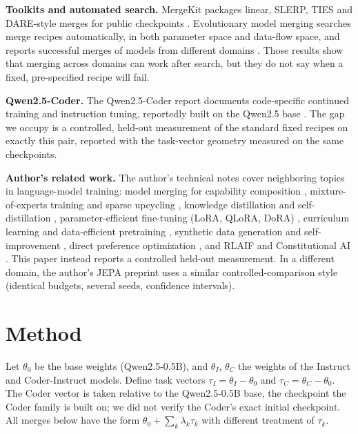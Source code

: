 \documentclass[conference]{IEEEtran}
\begin{document}
\textbf{Toolkits and automated search.} MergeKit packages linear, SLERP, TIES and DARE-style merges for public checkpoints \cite{goddard2024mergekit}. Evolutionary model merging searches merge recipes automatically, in both parameter space and data-flow space, and reports successful merges of models from different domains \cite{akiba2024evolutionary}. Those results show that merging across domains can work after search, but they do not say when a fixed, pre-specified recipe will fail.

\textbf{Qwen2.5-Coder.} The Qwen2.5-Coder report documents code-specific continued training and instruction tuning, reportedly built on the Qwen2.5 base \cite{hui2024qwen25coder}. The gap we occupy is a controlled, held-out measurement of the standard fixed recipes on exactly this pair, reported with the task-vector geometry measured on the same checkpoints.

\textbf{Author's related work.} The author's technical notes cover neighboring topics in language-model training: model merging for capability composition \cite{santos2026modelmergingfo}, mixture-of-experts training and sparse upcycling \cite{santos2026mixtureofexper}, knowledge distillation and self-distillation \cite{santos2026knowledgedisti}, parameter-efficient fine-tuning (LoRA, QLoRA, DoRA) \cite{santos2026parametereffic}, curriculum learning and data-efficient pretraining \cite{santos2026curriculumlear}, synthetic data generation and self-improvement \cite{santos2026syntheticdatag}, direct preference optimization \cite{santos2026directpreferen}, and RLAIF and Constitutional AI \cite{santos2026rlaifandconsti}. This paper instead reports a controlled held-out measurement. In a different domain, the author's JEPA preprint \cite{santos2026collapseresist} uses a similar controlled-comparison style (identical budgets, several seeds, confidence intervals).

\section{Method}
Let $\theta_0$ be the base weights (Qwen2.5-0.5B), and $\theta_I$, $\theta_C$ the weights of the Instruct and Coder-Instruct models. Define task vectors $\tau_I=\theta_I-\theta_0$ and $\tau_C=\theta_C-\theta_0$. The Coder vector is taken relative to the Qwen2.5-0.5B base, the checkpoint the Coder family is built on; we did not verify the Coder's exact initial checkpoint. All merges below have the form $\theta_0+\sum_k\lambda_k\tau_k$ with different treatment of $\tau_k$.
\end{document}
